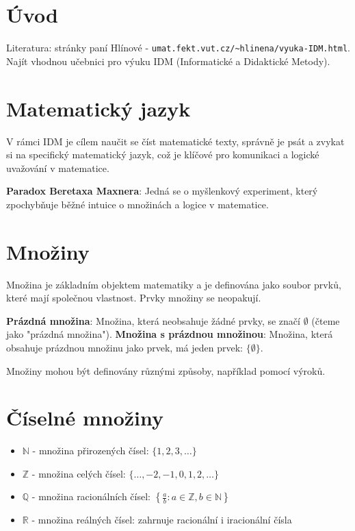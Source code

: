 \documentclass{article}
\begin{document}
\section{Úvod}
Literatura: stránky paní Hlínové - \texttt{umat.fekt.vut.cz/\textasciitilde hlinena/vyuka-IDM.html}.
Najít vhodnou učebnici pro výuku IDM (Informatické a Didaktické Metody).

\section{Matematický jazyk}
V rámci IDM je cílem naučit se číst matematické texty, správně je psát a zvykat si na specifický matematický jazyk, což je klíčové pro komunikaci a logické uvažování v matematice.

\textbf{Paradox Beretaxa Maxnera}:
Jedná se o myšlenkový experiment, který zpochybňuje běžné intuice o množinách a logice v matematice.

\section{Množiny}
Množina je základním objektem matematiky a je definována jako soubor prvků, které mají společnou vlastnost. Prvky množiny se neopakují.

\textbf{Prázdná množina}: Množina, která neobsahuje žádné prvky, se značí \(\emptyset\) (čteme jako "prázdná množina").
\textbf{Množina s prázdnou množinou}: Množina, která obsahuje prázdnou množinu jako prvek, má jeden prvek: \(\{\emptyset\}\).

Množiny mohou být definovány různými způsoby, například pomocí výroků.

\section{Číselné množiny}
\begin{itemize}
    \item \(\mathbb{N}\) - množina přirozených čísel: \(\{1, 2, 3, \dots\}\)
    \item \(\mathbb{Z}\) - množina celých čísel: \(\{\dots, -2, -1, 0, 1, 2, \dots\}\)
    \item \(\mathbb{Q}\) - množina racionálních čísel: \(\left\{\frac{a}{b} : a \in \mathbb{Z}, b \in \mathbb{N}\right\}\)
    \item \(\mathbb{R}\) - množina reálných čísel: zahrnuje racionální i iracionální čísla
\end{itemize}
\end{document}
